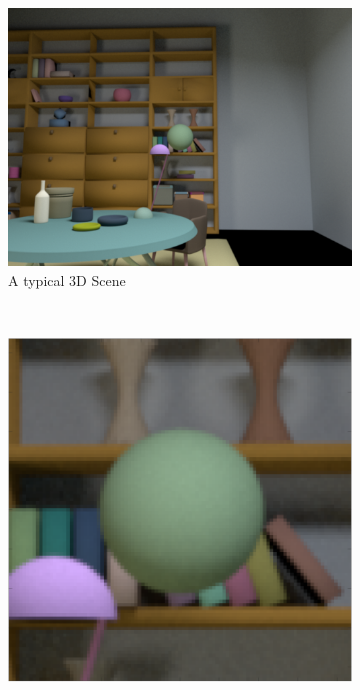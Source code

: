 \documentclass{jov}
\begin{document}
\begin{figure}
\centering
\begin{subfigure}[b]{0.25 \textwidth}
		\centering
        \includegraphics[width=\textwidth]{Figure3/3DScene.png}
        \caption{A typical 3D Scene}
        \label{fig:3DScene}
    \end{subfigure}
    ~ %
    \begin{subfigure}[b]{0.19 \textwidth}   
    \hspace{0.1 \textwidth}
        \includegraphics[width=\textwidth]{Figure3/croppedImage.png}

\end{subfigure}
\end{figure}
\end{document}
